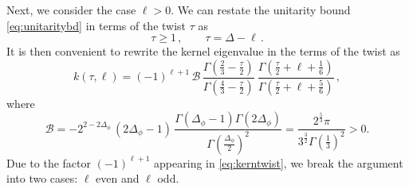 \documentclass[11pt]{article}
\begin{document}
Next, we consider the case $\ell > 0$. We can restate the unitarity bound \eqref{eq:unitaritybd} in terms of the twist $\tau$ as
%
\begin{equation}\label{eq:unitaritytwist}
\tau \geq 1\,, \qquad \tau = \Delta -\ell\,.
\end{equation}	
%
It is then convenient to rewrite the kernel eigenvalue in the terms of the twist as
%
\begin{equation}\label{eq:kerntwist}
k(\tau,\ell) = (-1)^{\ell+1} \, \mathcal{B} \, 
	\frac{\Gamma(\frac{2}{3}-\frac{\tau}{2})}{\Gamma(\frac{4}{3}-\frac{\tau}{2})} \ \frac{\Gamma(\frac{\tau}{2}+\ell+\frac{1}{6})}{\Gamma(\frac{\tau}{2} + \ell+\frac{5}{6})}\,,
\end{equation}	
%
where
%
\begin{equation}\label{eq:Bkdef}
\mathcal{B} = 
	-2^{2-2\Delta_\phi}\, (2\Delta_\phi-1)\, \frac{\Gamma(\Delta_\phi-1)\Gamma(2\Delta_\phi)}{\Gamma(\frac{\Delta_\phi}{2})^2} 
	= \frac{2^{\frac{5}{3}}\pi}{3^{\frac{3}{2}}\Gamma(\frac{1}{3})^2} > 0.
\end{equation}	
%
Due to the factor $(-1)^{\ell+1}$ appearing in \eqref{eq:kerntwist}, we break the argument into two cases: $\ell$ even and $\ell$ odd.
\end{document}
